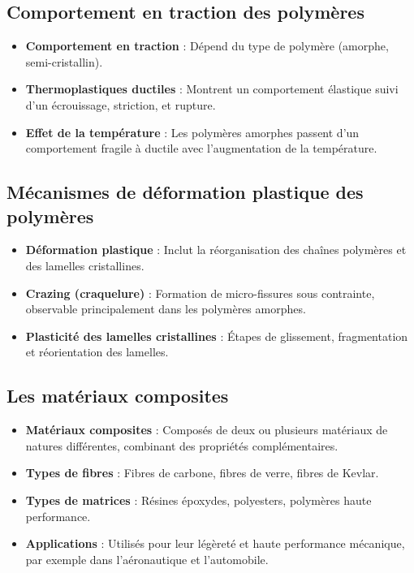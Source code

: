 \documentclass{article}
\begin{document}
    \subsection{Comportement en traction des polymères}
    
    \begin{itemize}
        \item \textbf{Comportement en traction} : Dépend du type de polymère (amorphe, semi-cristallin).
        \item \textbf{Thermoplastiques ductiles} : Montrent un comportement élastique suivi d'un écrouissage, striction, et rupture.
        \item \textbf{Effet de la température} : Les polymères amorphes passent d'un comportement fragile à ductile avec l'augmentation de la température.
    \end{itemize}
    
    \subsection{Mécanismes de déformation plastique des polymères}
    
    \begin{itemize}
        \item \textbf{Déformation plastique} : Inclut la réorganisation des chaînes polymères et des lamelles cristallines.
        \item \textbf{Crazing (craquelure)} : Formation de micro-fissures sous contrainte, observable principalement dans les polymères amorphes.
        \item \textbf{Plasticité des lamelles cristallines} : Étapes de glissement, fragmentation et réorientation des lamelles.
    \end{itemize}
    
    \subsection{Les matériaux composites}
    
    \begin{itemize}
        \item \textbf{Matériaux composites} : Composés de deux ou plusieurs matériaux de natures différentes, combinant des propriétés complémentaires.
        \item \textbf{Types de fibres} : Fibres de carbone, fibres de verre, fibres de Kevlar.
        \item \textbf{Types de matrices} : Résines époxydes, polyesters, polymères haute performance.
        \item \textbf{Applications} : Utilisés pour leur légèreté et haute performance mécanique, par exemple dans l'aéronautique et l'automobile.
    \end{itemize}
\end{document}
